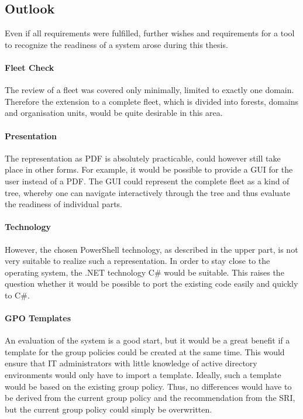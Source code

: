 \clearpage

\subsection{Outlook}
Even if all requirements were fulfilled, further wishes and requirements for a tool to recognize the readiness of a system arose during this thesis. 

\paragraph{Fleet Check}
The review of a fleet was covered only minimally, limited to exactly one domain. Therefore the extension to a complete fleet, which is divided into forests, domains and organisation units, would be quite desirable in this area. 

\paragraph{Presentation}
The representation as PDF is absolutely practicable, could however still take place in other forms. For example, it would be possible to provide a GUI for the user instead of a PDF. The GUI could represent the complete fleet as a kind of tree, whereby one can navigate interactively through the tree and thus evaluate the readiness of individual parts. 

\paragraph{Technology}
However, the chosen PowerShell technology, as described in the upper part, is not very suitable to realize such a representation. In order to stay close to the operating system, the .NET technology C\# would be suitable. This raises the question whether it would be possible to port the existing code easily and quickly to C\#. 

\paragraph{GPO Templates}
An evaluation of the system is a good start, but it would be a great benefit if a template for the group policies could be created at the same time. This would ensure that IT administrators with little knowledge of active directory environments would only have to import a template. Ideally, such a template would be based on the existing group policy. Thus, no differences would have to be derived from the current group policy and the recommendation from the SRI, but the current group policy could simply be overwritten.


